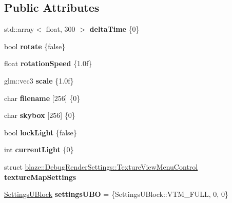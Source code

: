 \subsection*{Public Attributes}
\begin{DoxyCompactItemize}
\item 
\mbox{\label{structblaze_1_1DebugRenderSettings_a168d29d8f6efde16789dbc8ab2a2283c}} 
std\+::array$<$ float, 300 $>$ {\bfseries delta\+Time} \{0\}
\item 
\mbox{\label{structblaze_1_1DebugRenderSettings_a2d3ca3891cef536948730d170c5984b8}} 
bool {\bfseries rotate} \{false\}
\item 
\mbox{\label{structblaze_1_1DebugRenderSettings_a0e456c41c71fc3870d76327d10b913bb}} 
float {\bfseries rotation\+Speed} \{1.\+0f\}
\item 
\mbox{\label{structblaze_1_1DebugRenderSettings_a8bdec14f8d7eb62fa1232145b7c989b8}} 
glm\+::vec3 {\bfseries scale} \{1.\+0f\}
\item 
\mbox{\label{structblaze_1_1DebugRenderSettings_aca85821e0ed410d4e6fe6e68c8c35a38}} 
char {\bfseries filename} \mbox{[}256\mbox{]} \{0\}
\item 
\mbox{\label{structblaze_1_1DebugRenderSettings_ab5f8f297ec07ed32d02864862861adcd}} 
char {\bfseries skybox} \mbox{[}256\mbox{]} \{0\}
\item 
\mbox{\label{structblaze_1_1DebugRenderSettings_a2ab760f8e78d74c959bab3cf9d7ae512}} 
bool {\bfseries lock\+Light} \{false\}
\item 
\mbox{\label{structblaze_1_1DebugRenderSettings_ac16b647cd5a79f88bb74c2a90630af40}} 
int {\bfseries current\+Light} \{0\}
\item 
\mbox{\label{structblaze_1_1DebugRenderSettings_a336b29df42f5b248e263c08951a44246}} 
struct \hyperlink{structblaze_1_1DebugRenderSettings_1_1TextureViewMenuControl}{blaze\+::\+Debug\+Render\+Settings\+::\+Texture\+View\+Menu\+Control} {\bfseries texture\+Map\+Settings}
\item 
\mbox{\label{structblaze_1_1DebugRenderSettings_acc93abf5152d147ac80bf0ab0233121e}} 
\hyperlink{structblaze_1_1SettingsUBlock}{Settings\+U\+Block} {\bfseries settings\+U\+BO} = \{Settings\+U\+Block\+::\+V\+T\+M\+\_\+\+F\+U\+LL, 0, 0\}
\end{DoxyCompactItemize}


